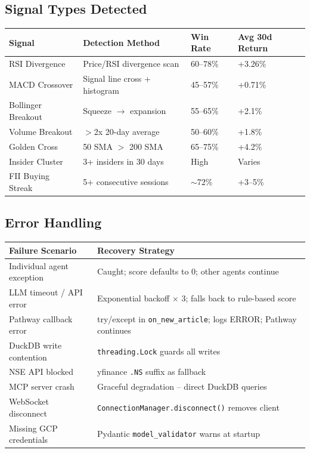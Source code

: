 \documentclass[11pt, a4paper]{article}
\begin{document}
\subsection{Signal Types Detected}

\begin{center}
\small
\begin{tabular}{L{3.5cm} L{3.5cm} C{2cm} C{2.5cm}}
  \toprule
  \textbf{Signal} & \textbf{Detection Method} & \textbf{Win Rate} & \textbf{Avg 30d Return} \\
  \midrule
  RSI Divergence      & Price/RSI divergence scan & 60--78\% & +3.26\% \\
  MACD Crossover      & Signal line cross + histogram & 45--57\% & +0.71\% \\
  Bollinger Breakout  & Squeeze $\to$ expansion & 55--65\% & +2.1\% \\
  Volume Breakout     & $>$2x 20-day average & 50--60\% & +1.8\% \\
  Golden Cross        & 50 SMA $>$ 200 SMA & 65--75\% & +4.2\% \\
  Insider Cluster     & 3+ insiders in 30 days & High & Varies \\
  FII Buying Streak   & 5+ consecutive sessions & $\sim$72\% & +3--5\% \\
  \bottomrule
\end{tabular}
\end{center}

\subsection{Error Handling}

\begin{center}
\small
\begin{tabular}{L{3.8cm} L{9.5cm}}
  \toprule
  \textbf{Failure Scenario} & \textbf{Recovery Strategy} \\
  \midrule
  Individual agent exception & Caught; score defaults to 0; other agents continue \\
  LLM timeout / API error & Exponential backoff $\times$ 3; falls back to rule-based score \\
  Pathway callback error & try/except in \texttt{on\_new\_article}; logs ERROR; Pathway continues \\
  DuckDB write contention & \texttt{threading.Lock} guards all writes \\
  NSE API blocked & yfinance \texttt{.NS} suffix as fallback \\
  MCP server crash & Graceful degradation -- direct DuckDB queries \\
  WebSocket disconnect & \texttt{ConnectionManager.disconnect()} removes client \\
  Missing GCP credentials & Pydantic \texttt{model\_validator} warns at startup \\
  \bottomrule
\end{tabular}
\end{center}
\end{document}
